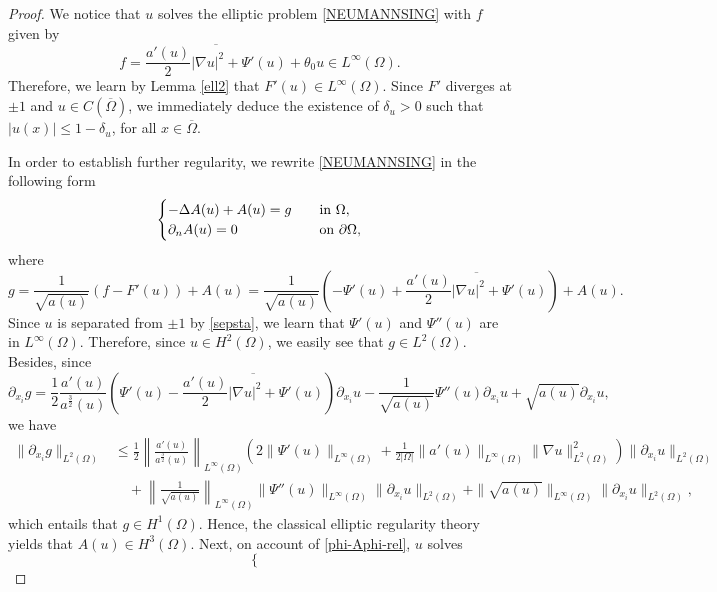 \documentclass[10pt,a4paper]{amsart}
\def\n{\textbf{\textit{n}}}
\def\u{u}
\begin{document}
\begin{proof}
We notice that $\u$ solves the elliptic problem \eqref{NEUMANNSING} with $f$ given by
$$f=\overline{\frac{a'(\u)}{2} |\nabla \u|^2+\Psi'(\u)}+\theta_0 \u\in L^\infty(\Omega).$$
Therefore,  we learn by Lemma \ref{ell2} that $F'(\u)\in L^\infty(\Omega)$. Since $F'$ diverges at $\pm 1$ and
$\u\in C(\overline{\Omega})$, we immediately deduce the existence of $\delta_u>0$ such that
$|\u(x)|\leq 1-\delta_u$, for all $x\in \overline{\Omega}$.

\smallskip
In order to establish further regularity, we rewrite \eqref{NEUMANNSING} in the following form
\begin{equation}
\label{Aphi-ELL-0}
\begin{cases}
-\Delta A(\u)+ A(\u) = g \quad &\text{in }\Omega,\\
\partial_{\n} A(\u)=0\quad &\text{on }\partial\Omega,
\end{cases}
\end{equation}
where
$$
g=\frac{1}{\sqrt{a(\u)}}(f-F'(\u))+A(\u)=\frac{1}{\sqrt{a(\u)}}\left(-\Psi'(\u)+\overline{\frac{a'(\u)}{2} |\nabla \u|^2+\Psi'(\u)}\right)+A(\u).
$$
Since $\u$ is separated from $\pm 1$ by \eqref{sepsta}, we learn that $\Psi'(\u)$ and $\Psi''(\u)$ are in $L^\infty(\Omega)$. Therefore, since $\u\in H^2(\Omega)$, we easily see that
$g\in L^2(\Omega)$. Besides, since
$$
\partial_{x_i}g = \frac12
\frac{a'(\u)}{a^\frac32(\u)} \left( \Psi'(\u)-\overline{\frac{a'(\u)}{2} |\nabla \u|^2+\Psi'(\u)}\right) \partial_{x_i} \u
-
\frac{1}{\sqrt{a(\u)}} \Psi''(\u) \partial_{x_i} \u + \sqrt{a(\u)}\partial_{x_i} \u,
$$
we have
\begin{align*}
\|\partial_{x_i}g\|_{L^2(\Omega)} &\leq \frac12
\left\|\frac{a'(\u)}{a^\frac32(\u)}\right\|_{L^\infty(\Omega)} 
\left(  2\|\Psi'(\u)\|_{L^\infty(\Omega)} + \frac{1}{2 |\Omega|} 
\| a'(u)\|_{L^\infty(\Omega)} \| \nabla u\|_{L^2(\Omega)}^2 \right)
\| \partial_{x_i} \u\|_{L^2(\Omega)}\\
&\quad +
\left\|\frac{1}{\sqrt{a(\u)}}\right\|_{L^\infty(\Omega)}\| \Psi''(\u)\|_{L^\infty(\Omega)}\| \partial_{x_i} \u\|_{L^2(\Omega)} + \|\sqrt{a(\u)}\|_{L^\infty(\Omega)}\|\partial_{x_i} \u\|_{L^2(\Omega)},
\end{align*}
which entails that $g\in H^1(\Omega)$. Hence, the classical elliptic regularity theory yields that $A(\u)\in H^3(\Omega)$. Next,
on account of \eqref{phi-Aphi-rel}, $u$ solves
\begin{equation}
\label{Aphi-ELL-0-1}
\begin{cases}

\end{cases}
\end{equation}
\end{proof}
\end{document}
